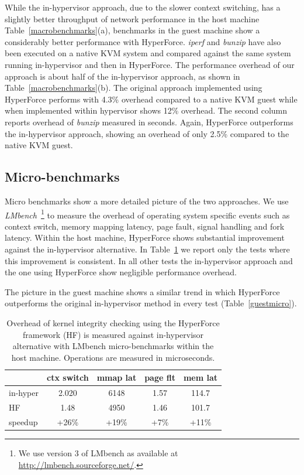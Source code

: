 While the in-hypervisor approach, due to the slower context switching, has a slightly better throughput of network performance in the host machine
Table~\ref{macrobenchmarks}(a), benchmarks in the guest machine show a considerably better performance with HyperForce.   
\emph{iperf} and \emph{bunzip} have also been executed on a native KVM system and compared against the same system running in-hypervisor and then in HyperForce. 
The performance overhead of our approach is about half of the in-hypervisor approach, as shown in Table~\ref{macrobenchmarks}(b). The original approach implemented using HyperForce performs with 4.3\% overhead compared to a native KVM guest while when implemented within hypervisor shows 12\% overhead.
The second column reports overhead of \textit{bunzip} measured in seconds. Again, HyperForce outperforms the in-hypervisor approach, showing an overhead of only 2.5\% compared to the native KVM guest.
  

\subsection{Micro-benchmarks} \label{microbench}
Micro benchmarks show a more detailed picture of the two approaches. 
We use \emph{LMbench}~\cite{lmbench-paper}\footnote{We use version 3 of
LMbench as available at \url{http://lmbench.sourceforge.net/}.} to measure the overhead of operating system specific events such as context switch, memory mapping latency, page fault, signal handling and fork latency.
Within the host machine, HyperForce shows substantial improvement against the in-hypervisor alternative. 
In Table~\ref{hostmicro} we report only the tests where this improvement is consistent. In all other tests the in-hypervisor approach and the one using HyperForce show negligible performance overhead. 

The picture in the guest machine shows a similar trend in which HyperForce outperforms the original in-hypervisor method in every test (Table~\ref{guestmicro}).


\begin{table}[htdp]
\begin{center}
\begin{tabular}{| l | c | c | c | c | }
\hline
~ & ctx switch  & mmap lat  & page flt 	 & mem lat \\
\hline
in-hyper     & 2.020  &	6148	&	1.57		&114.7  \\
HF		& 1.48    &	4950	&	1.46		& 101.7 \\
\hline
speedup         &+26\% & +19\% & +7\% & +11\% \\
\hline
\end{tabular}
\caption{Overhead of kernel integrity checking using the HyperForce framework (HF) is measured against in-hypervisor alternative with LMbench micro-benchmarks within the host machine. Operations are measured in microseconds.}
\vspace{0.3cm}
\end{center}
\label{hostmicro}
\end{table}%

